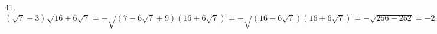 41. $(\sqrt{7}-3)\sqrt{16+6\sqrt{7}}=-\sqrt{(7-6\sqrt{7}+9)(16+6\sqrt{7})}=-\sqrt{(16-6\sqrt{7})(16+6\sqrt{7})}=-\sqrt{256-252}=-2.$\\

